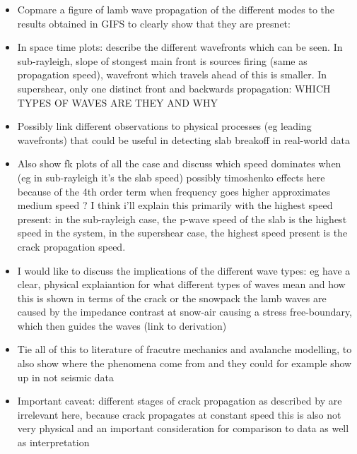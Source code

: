 \documentclass[10pt]{article}
\begin{document}
\begin{itemize}
  \item Copmare a figure of lamb wave propagation of the different modes to the results obtained in GIFS to clearly show that they are presnet: 
  \item In space time plots: describe the different wavefronts which can be seen. In sub-rayleigh, slope of stongest main front is sources firing (same as propagation speed), wavefront which travels ahead of this is smaller. In supershear, only one distinct front and backwards propagation: WHICH TYPES OF WAVES ARE THEY AND WHY 
  \item Possibly link different observations to physical processes (eg leading wavefronts) that could be useful in detecting slab breakoff in real-world data
  \item Also show fk plots of all the case and discuss which speed dominates when (eg in sub-rayleigh it's the slab speed) \rightarrow possibly timoshenko effects here because of the 4th order term when frequency goes higher approximates medium speed ? I think i'll explain this primarily with the highest speed present: in the sub-rayleigh case, the p-wave speed of the slab is the highest speed in the system, in the supershear case, the highest speed present is the crack propagation speed. 
  \item I would like to discuss the implications of the different wave types: eg have a clear, physical explaiantion for what different types of waves mean and how this is shown in terms of the crack or the snowpack \rightarrow the lamb waves are caused by the impedance contrast at snow-air causing a stress free-boundary, which then guides the waves (link to derivation)
  \item Tie all of this to literature of fracutre mechanics and avalanche modelling, to also show where the phenomena come from and they could for example show up in not seismic data 
  \item Important caveat: different stages of crack propagation as described by \cite{bobillierNumericalInvestigationCrack2024} are irrelevant here, because crack propagates at constant speed \rightarrow this is also not very physical and an important consideration for comparison to data as well as interpretation
\end{itemize}
\end{document}
